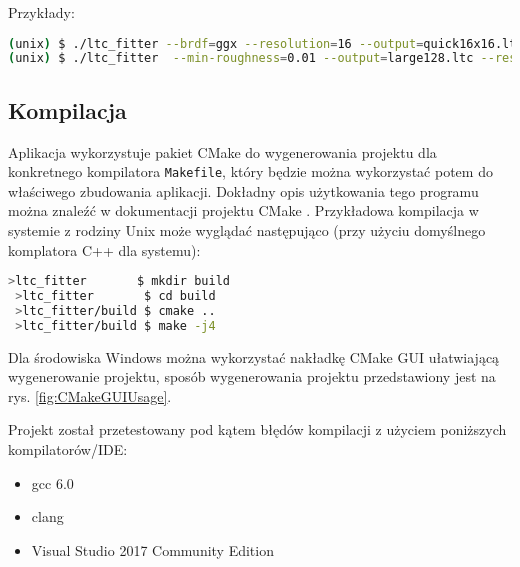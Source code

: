 \documentclass[../main.tex]{subfiles}
\begin{document}
Przykłady:

\begin{lstlisting}[language=bash,numbers=none]
(unix) $ ./ltc_fitter --brdf=ggx --resolution=16 --output=quick16x16.ltc
(unix) $ ./ltc_fitter  --min-roughness=0.01 --output=large128.ltc --resolution=128
\end{lstlisting}

\subsection{Kompilacja}
\label{section:ltcFitterCompilation}

Aplikacja wykorzystuje pakiet CMake do wygenerowania projektu dla konkretnego kompilatora \texttt{Makefile}, który będzie można wykorzystać potem do właściwego zbudowania aplikacji. Dokładny opis użytkowania tego programu można znaleźć w dokumentacji projektu CMake \cite{CMakeDoc}. Przykładowa kompilacja w systemie z rodziny Unix może wyglądać następująco (przy użyciu domyślnego komplatora C++ dla systemu):
\begin{lstlisting}[language=bash,numbers=none]
 >ltc_fitter       $ mkdir build
 >ltc_fitter       $ cd build
 >ltc_fitter/build $ cmake ..
 >ltc_fitter/build $ make -j4
\end{lstlisting}

Dla środowiska Windows można wykorzystać nakładkę CMake GUI ułatwiającą wygenerowanie projektu, sposób wygenerowania projektu przedstawiony jest na rys. \ref{fig:CMakeGUIUsage}.

Projekt został przetestowany pod kątem błędów kompilacji z użyciem poniższych kompilatorów/IDE:
\begin{itemize}
    \item gcc 6.0
    \item clang
    \item Visual Studio 2017 Community Edition
\end{itemize}
\end{document}
